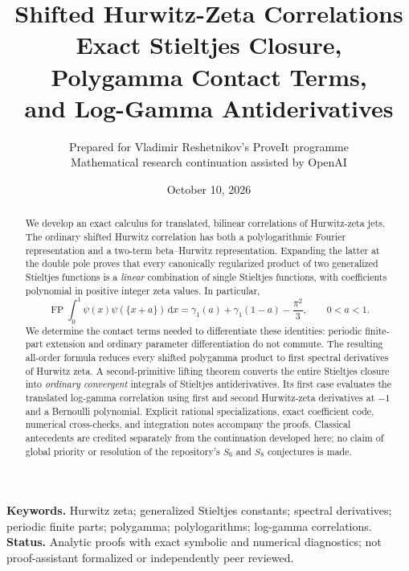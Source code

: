 \documentclass[11pt,letterpaper]{article}
\title{Shifted Hurwitz-Zeta Correlations\\[5pt]\large Exact Stieltjes Closure, Polygamma Contact Terms,\\and Log-Gamma Antiderivatives}
\author{Prepared for Vladimir Reshetnikov's ProveIt programme\\\small Mathematical research continuation assisted by OpenAI}
\date{October 10, 2026}
\numberwithin{equation}{section}
\theoremstyle{definition}
\theoremstyle{remark}
\DeclareMathOperator{\FP}{FP}
\newcommand{\dd}{\,\mathrm{d}}
\begin{document}
\maketitle
\begin{abstract}
We develop an exact calculus for translated, bilinear correlations of Hurwitz-zeta jets. The ordinary shifted Hurwitz correlation has both a polylogarithmic Fourier representation and a two-term beta--Hurwitz representation. Expanding the latter at the double pole proves that every canonically regularized product of two generalized Stieltjes functions is a \emph{linear} combination of single Stieltjes functions, with coefficients polynomial in positive integer zeta values. In particular,
\[
\FP\int_0^1\psi(x)\psi(\{x+a\})\dd x
=\gamma_1(a)+\gamma_1(1-a)-\frac{\pi^2}{3},\qquad 0<a<1.
\]
We determine the contact terms needed to differentiate these identities: periodic finite-part extension and ordinary parameter differentiation do not commute. The resulting all-order formula reduces every shifted polygamma product to first spectral derivatives of Hurwitz zeta. A second-primitive lifting theorem converts the entire Stieltjes closure into \emph{ordinary convergent} integrals of Stieltjes antiderivatives. Its first case evaluates the translated log-gamma correlation using first and second Hurwitz-zeta derivatives at $-1$ and a Bernoulli polynomial. Explicit rational specializations, exact coefficient code, numerical cross-checks, and integration notes accompany the proofs. Classical antecedents are credited separately from the continuation developed here; no claim of global priority or resolution of the repository's $S_6$ and $S_8$ conjectures is made.
\end{abstract}
\vspace{4pt}
\noindent\textbf{Keywords.} Hurwitz zeta; generalized Stieltjes constants; spectral derivatives; periodic finite parts; polygamma; polylogarithms; log-gamma correlations.\\
\textbf{Status.} Analytic proofs with exact symbolic and numerical diagnostics; not proof-assistant formalized or independently peer reviewed.
\newpage
\tableofcontents
\newpage


\end{document}
